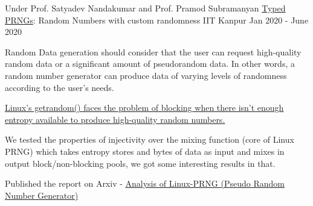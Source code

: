 \begin{cventries}


  \cventry
    {Under Prof. Satyadev Nandakumar and Prof. Pramod Subramanyan} %
    {\href{https://arxiv.org/abs/2312.03369}{Typed PRNGs}: Random Numbers with custom randomness} %
    {IIT Kanpur} %
    {Jan 2020 - June 2020} %
    {
      \begin{cvitems} %
      \item Random Data generation should consider that the user can request high-quality random data or a significant amount of pseudorandom data. In other words, a random number generator can produce data of varying levels of randomness according to the user's needs.
      \item \href{https://lwn.net/Articles/800509/}{Linux's getrandom() faces the problem of blocking when there isn't enough entropy available to produce high-quality random numbers.}
      \item We tested the properties of injectivity over the mixing function (core of Linux PRNG) which takes entropy stores and bytes of data as input and mixes in output block/non-blocking pools, we got some interesting results in that.
      \item Published the report on Arxiv - \href{https://arxiv.org/abs/2312.03369}{Analysis of Linux-PRNG (Pseudo Random Number Generator)}
      \end{cvitems}
    }





\end{cventries}
